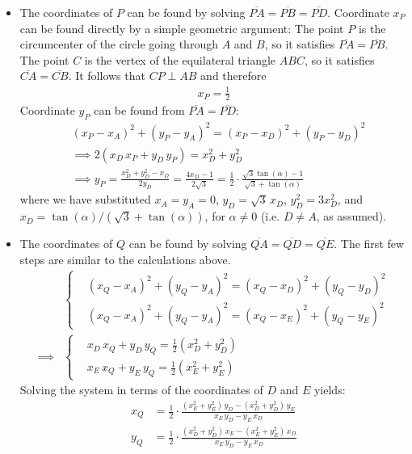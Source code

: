 \begin{itemize}
\item The coordinates of $P$ can be found by solving $\overline{PA}=\overline{PB}=\overline{PD}$. Coordinate $x_{P}$ can be found directly by a simple geometric argument: The point $P$ is the circumcenter of the circle going through $A$ and $B$, so it satisfies $\overline{PA}=\overline{PB}$. The point $C$ is the vertex of the equilateral triangle $ABC$, so it satisfies $\overline{CA}=\overline{CB}$. It follows that $CP \perp AB$ and therefore
\begin{align*}
x_{P} = \frac{1}{2}
\end{align*}
Coordinate $y_{P}$ can be found from $\overline{PA}=\overline{PD}$:
\begin{align*}
& (x_{P}-x_{A})^{2} + (y_{P}-y_{A})^{2} 
  = (x_{P}-x_{D})^{2} + (y_{P}-y_{D})^{2} 
\\
& \implies
2(x_{D}\, x_{P} + y_{D}\, y_{P})
  = x_{D}^{2} + y_{D}^{2}
\\[1ex]
& \implies
y_{P}
  = \frac{x_{D}^{2} + y_{D}^{2} - x_{D}}{2y_{D}}
  = \frac{4x_{D}-1}{2\sqrt{3}}
  = \frac{1}{2} \cdot \frac{\sqrt{3}\tan(\alpha)-1}{\sqrt{3}+\tan(\alpha)}
\end{align*}
where we have substituted $x_{A}=y_{A}=0$, $y_{D}=\sqrt{3}\,x_{D}$, $y_{D}^{2}=3x_{D}^{2}$, and $x_{D}=\tan(\alpha)/(\sqrt{3}+\tan(\alpha))$, for $\alpha\ne0$ (i.e. $D \ne A$, as assumed).

\item The coordinates of $Q$ can be found by solving $\overline{QA}=\overline{QD}=\overline{QE}$. The first few steps are similar to the calculations above. 
\begin{align*}
& \scriptscriptstyle
\begin{cases}
& (x_{Q}-x_{A})^{2} + (y_{Q}-y_{A})^{2} 
  = (x_{Q}-x_{D})^{2} + (y_{Q}-y_{D})^{2} 
\\
& (x_{Q}-x_{A})^{2} + (y_{Q}-y_{A})^{2} 
  = (x_{Q}-x_{E})^{2} + (y_{Q}-y_{E})^{2} 
\end{cases}
\\ \implies
& \scriptscriptstyle
\begin{cases}
& x_{D} \, x_{Q} + y_{D} \, y_{Q} = \frac{1}{2} (x_{D}^{2}+y_{D}^{2})
\\
& x_{E} \, x_{Q} + y_{E} \, y_{Q} = \frac{1}{2} (x_{E}^{2}+y_{E}^{2})
\end{cases}
\end{align*}
Solving the system in terms of the coordinates of $D$ and $E$ yields:
\begin{align*}
x_{Q} & = 
\frac{1}{2} \cdot \frac{(x_{E}^{2}+y_{E}^{2}) \, y_{D} - (x_{D}^{2}+y_{D}^{2}) \, y_{E}}{x_{E} \, y_{D} - y_{E} \, x_{D}}
\\
y_{Q} & = 
\frac{1}{2} \cdot \frac{(x_{D}^{2}+y_{D}^{2}) \, x_{E} - (x_{E}^{2}+y_{E}^{2}) \, x_{D}}{x_{E} \, y_{D} - y_{E} \, x_{D}}
\end{align*}

\end{itemize}



